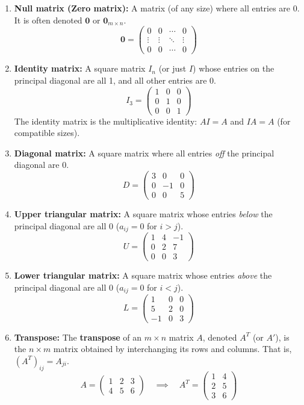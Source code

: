 \documentclass[oneside]{book}
\begin{document}
\begin{enumerate}
    \item \textbf{Null matrix (Zero matrix):} A matrix (of any size) where all entries are 0. It is often denoted $\mathbf{0}$ or $\mathbf{0}_{m \times n}$.
    \[ \mathbf{0} = \begin{pmatrix} 0 & 0 & \cdots & 0 \\ \vdots & \vdots & \ddots & \vdots \\ 0 & 0 & \cdots & 0 \end{pmatrix} \]
    \item \textbf{Identity matrix:} A square matrix $I_n$ (or just $I$) whose entries on the principal diagonal are all 1, and all other entries are 0.
    \[ I_3 = \begin{pmatrix} 1 & 0 & 0 \\ 0 & 1 & 0 \\ 0 & 0 & 1 \end{pmatrix} \]
    The identity matrix is the multiplicative identity: $AI = A$ and $IA = A$ (for compatible sizes).
    \item \textbf{Diagonal matrix:} A square matrix where all entries \emph{off} the principal diagonal are 0.
    \[ D = \begin{pmatrix} 3 & 0 & 0 \\ 0 & -1 & 0 \\ 0 & 0 & 5 \end{pmatrix} \]
    \item \textbf{Upper triangular matrix:} A square matrix whose entries \emph{below} the principal diagonal are all 0 ($a_{ij} = 0$ for $i > j$).
    \[ U = \begin{pmatrix} 1 & 4 & -1 \\ 0 & 2 & 7 \\ 0 & 0 & 3 \end{pmatrix} \]
    \item \textbf{Lower triangular matrix:} A square matrix whose entries \emph{above} the principal diagonal are all 0 ($a_{ij} = 0$ for $i < j$).
    \[ L = \begin{pmatrix} 1 & 0 & 0 \\ 5 & 2 & 0 \\ -1 & 0 & 3 \end{pmatrix} \]
    \item \textbf{Transpose:} The \textbf{transpose} of an $m \times n$ matrix $A$, denoted $A^T$ (or $A'$), is the $n \times m$ matrix obtained by interchanging its rows and columns. That is, $(A^T)_{ij} = A_{ji}$.
    \[ A = \begin{pmatrix} 1 & 2 & 3 \\ 4 & 5 & 6 \end{pmatrix} \quad \implies \quad A^T = \begin{pmatrix} 1 & 4 \\ 2 & 5 \\ 3 & 6 \end{pmatrix} \]

\end{enumerate}
\end{document}
